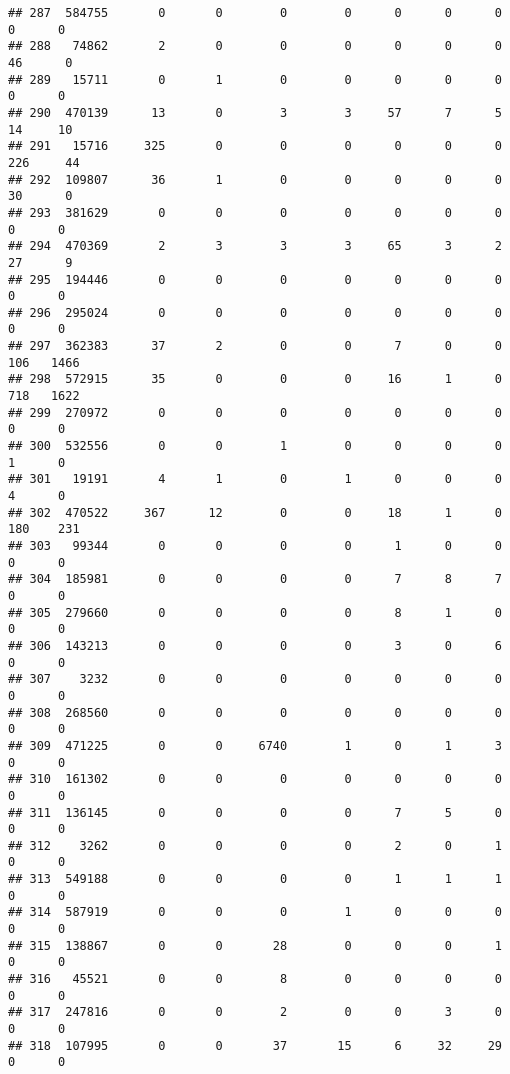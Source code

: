 \documentclass[
]{article}
\begin{document}
\begin{verbatim}
## 287  584755       0       0        0        0      0      0      0     0      0
## 288   74862       2       0        0        0      0      0      0    46      0
## 289   15711       0       1        0        0      0      0      0     0      0
## 290  470139      13       0        3        3     57      7      5    14     10
## 291   15716     325       0        0        0      0      0      0   226     44
## 292  109807      36       1        0        0      0      0      0    30      0
## 293  381629       0       0        0        0      0      0      0     0      0
## 294  470369       2       3        3        3     65      3      2    27      9
## 295  194446       0       0        0        0      0      0      0     0      0
## 296  295024       0       0        0        0      0      0      0     0      0
## 297  362383      37       2        0        0      7      0      0   106   1466
## 298  572915      35       0        0        0     16      1      0   718   1622
## 299  270972       0       0        0        0      0      0      0     0      0
## 300  532556       0       0        1        0      0      0      0     1      0
## 301   19191       4       1        0        1      0      0      0     4      0
## 302  470522     367      12        0        0     18      1      0   180    231
## 303   99344       0       0        0        0      1      0      0     0      0
## 304  185981       0       0        0        0      7      8      7     0      0
## 305  279660       0       0        0        0      8      1      0     0      0
## 306  143213       0       0        0        0      3      0      6     0      0
## 307    3232       0       0        0        0      0      0      0     0      0
## 308  268560       0       0        0        0      0      0      0     0      0
## 309  471225       0       0     6740        1      0      1      3     0      0
## 310  161302       0       0        0        0      0      0      0     0      0
## 311  136145       0       0        0        0      7      5      0     0      0
## 312    3262       0       0        0        0      2      0      1     0      0
## 313  549188       0       0        0        0      1      1      1     0      0
## 314  587919       0       0        0        1      0      0      0     0      0
## 315  138867       0       0       28        0      0      0      1     0      0
## 316   45521       0       0        8        0      0      0      0     0      0
## 317  247816       0       0        2        0      0      3      0     0      0
## 318  107995       0       0       37       15      6     32     29     0      0

\end{verbatim}
\end{document}
